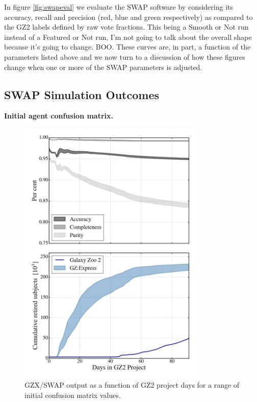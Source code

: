 \documentclass[twocolumn]{aastex6}
\begin{document}
In figure \ref{fig:swapeval} we evaluate the SWAP software by considering
its accuracy, recall and precision (red, blue and green respectively) as compared 
to the GZ2 labels defined by raw vote fractions.  This being a Smooth or Not run
instead of a Featured or Not run, I'm not going to talk about the overall shape
because it's going to change. BOO. These curves are, in part, a 
function of the parameters listed above and we now turn to a discussion of 
how these figures change when one or more of the SWAP parameters is adjusted. 


\subsection{SWAP Simulation Outcomes}

\textbf{Initial agent confusion matrix.} 

\begin{figure}[t!]
\includegraphics[width=3.5in]{figures/GZX_eval_and_retirement_PLPD_spread_4paper.png}
\caption{GZX/SWAP output as a function of GZ2 project days for a range of initial
confusion matrix values.  \label{fig: confusionMatrixAnalysis}}
\end{figure}
\end{document}
